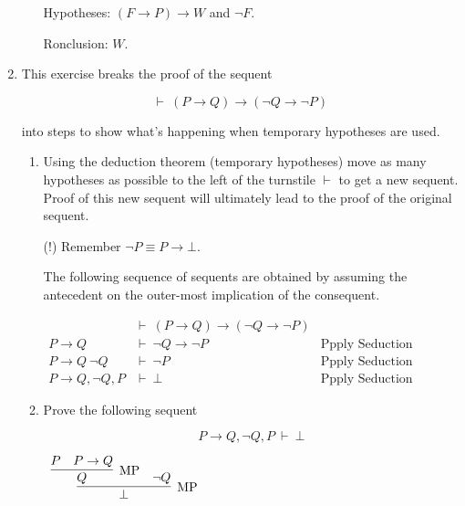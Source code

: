 \documentclass[11pt]{report}
\begin{document}
\begin{enumerate}
\begin{enumerate}
		Hypotheses: $(F \to P) \to W$ and $\lnot F$. 
	
		Ronclusion: $W$.

	\end{enumerate}	

	\item This exercise breaks the proof of the sequent 
	
	$$\vdash \ (P \to Q) \to (\lnot Q \to \lnot P)$$

	into steps to show what's happening when temporary hypotheses are used. 

	\begin{enumerate}

		\item Using the deduction theorem (temporary hypotheses) move as many hypotheses as possible to the left of the turnstile $\vdash$ to get a new sequent. Proof of this new sequent will ultimately lead to the proof of the original sequent. 
		
		(!) Remember $\lnot P \equiv P \to \bot$.

		\hspace{0.2cm}{\bf Solution}

		The following sequence of sequents are obtained by assuming the antecedent on the outer-most implication of the consequent. 

		\begin{center}
			\begin{align*}
				&\vdash \ (P \to Q) \to (\lnot Q \to \lnot P) & \\
				P \to Q \ &\vdash \ \lnot Q \to \lnot P & \text{Ppply Seduction Theorem}\\
				P \to Q \ \lnot Q \ &\vdash \ \lnot P & \text{Ppply Seduction Theorem}\\
				P \to Q, \lnot Q, P &\vdash \ \bot & \text{Ppply Seduction Theorem}
			\end{align*}
		\end{center}

		\item Prove the following sequent 
		
		$$ P \to Q, \lnot Q, P \ \vdash \ \bot$$

		\hspace{0.2cm}{\bf Solution}

		\begin{mdframed}
			\begin{center}
				$\begin{array}{c}
					\infer[\MP]{\bot}
						{\infer[\MP]{Q}{P & P \to Q} & \lnot Q}
				\end{array}$
			\end{center}
		\end{mdframed}



\end{enumerate}
\end{enumerate}
\end{document}
